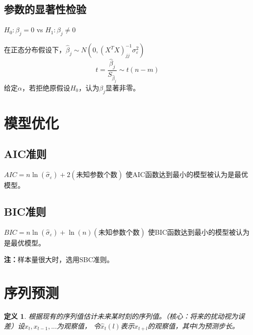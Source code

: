 \documentclass[12pt, a4paper, oneside]{ctexbook}
\newtheorem{definition}[theorem]{定义}
\begin{document}
\subsection{参数的显著性检验}
\begin{center}
    $H_0:\beta_j= 0$ vs
    $H_1:\beta_j \neq 0$
\end{center}
在正态分布假设下，$\hat{\beta}_j\sim N(0,(X^TX)_{jj}^{-1}\sigma_{\varepsilon}^2)$
\begin{equation*}
    t = \frac{\hat{\beta}_j}{S_{\hat{\beta}_j}} \sim t(n-m)
\end{equation*}
给定$\alpha$，若拒绝原假设$H_0$，认为$\beta_j$显著非零。

\section{模型优化}
\subsection{AIC准则}
$AIC = n\ln(\hat{\sigma}_{\varepsilon}) + 2(\text{未知参数个数})$
使AIC函数达到最小的模型被认为是最优模型。

\subsection{BIC准则}
$BIC = n\ln(\hat{\sigma}_{\varepsilon}) + \ln(n)(\text{未知参数个数})$
使BIC函数达到最小的模型被认为是最优模型。

\textbf{注：}样本量很大时，选用SBC准则。

\section{序列预测}
\begin{definition}
    根据现有的序列值估计未来某时刻的序列值。（核心：将来的扰动视为误差）设$x_t,x_{t-1},...$为观察值，
    令$\hat{x}_t(l)$表示$x_{t+l}$的观察值，其中$l$为预测步长。
\end{definition}
\end{document}
